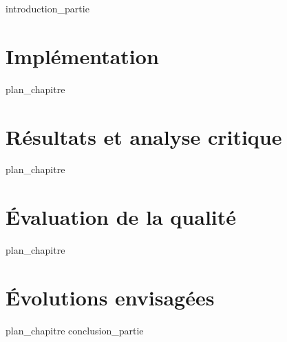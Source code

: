 \label{part:01_int}
{introduction_partie}
%
\chapter{Implémentation }
\label{chap:09}
{plan_chapitre}
%
\chapter{Résultats et analyse critique }
\label{chap:10}
{plan_chapitre}
%
\chapter{Évaluation de la qualité }
\label{chap:11}
{plan_chapitre}
%
\chapter{Évolutions envisagées }
\label{chap:12}
{plan_chapitre}
%
\label{part:01_cnc}
{conclusion_partie}
